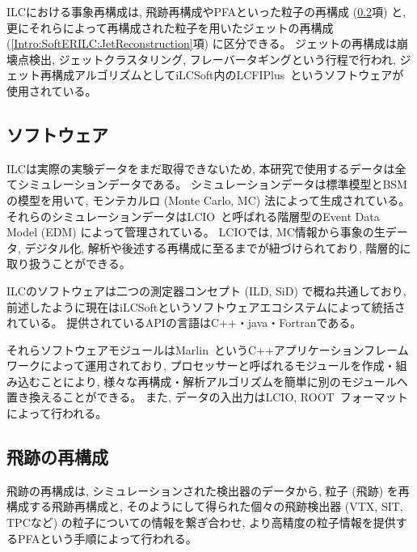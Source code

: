 ILCにおける事象再構成は, 飛跡再構成やPFAといった粒子の再構成 (\ref{Intro:SoftERILC:ParticleReconstruction}項) と, 更にそれらによって再構成された粒子を用いたジェットの再構成 (\ref{Intro:SoftERILC:JetReconstruction}項) に区分できる。
ジェットの再構成は崩壊点検出, ジェットクラスタリング, フレーバータギングという行程で行われ, ジェット再構成アルゴリズムとしてiLCSoft内のLCFIPlus~\cite{LCFIPlus, LCFIPlusPaper}というソフトウェアが使用されている。


\subsection{ソフトウェア} \label{Intro:SoftERILC:Software}

ILCは実際の実験データをまだ取得できないため, 本研究で使用するデータは全てシミュレーションデータである。
シミュレーションデータは標準模型とBSMの模型を用いて, モンテカルロ (Monte Carlo, MC) 法によって生成されている。
それらのシミュレーションデータはLCIO~\cite{lcio}と呼ばれる階層型のEvent Data Model (EDM) によって管理されている。
LCIOでは, MC情報から事象の生データ, デジタル化, 解析や後述する再構成に至るまでが紐づけられており, 階層的に取り扱うことができる。

ILCのソフトウェアは二つの測定器コンセプト (ILD, SiD) で概ね共通しており, 前述したように現在はiLCSoftというソフトウェアエコシステムによって統括されている。
提供されているAPIの言語はC++・java・Fortranである。

それらソフトウェアモジュールはMarlin~\cite{Marlinpaper}というC++アプリケーションフレームワークによって運用されており, プロセッサーと呼ばれるモジュールを作成・組み込むことにより, 様々な再構成・解析アルゴリズムを簡単に別のモジュールへ置き換えることができる。
また, データの入出力はLCIO, ROOT~\cite{root}フォーマットによって行われる。

\newpage
\subsection{飛跡の再構成} \label{Intro:SoftERILC:ParticleReconstruction}

飛跡の再構成は, シミュレーションされた検出器のデータから, 粒子 (飛跡) を再構成する飛跡再構成と, そのようにして得られた個々の飛跡検出器 (VTX, SIT, TPCなど) の粒子についての情報を繋ぎ合わせ, より高精度の粒子情報を提供するPFAという手順によって行われる。\\

